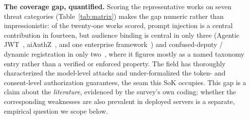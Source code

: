 \noindent\textbf{The coverage gap, quantified.} Scoring the representative works on
seven threat categories (Table~\ref{tab:matrix}) makes the gap numeric rather than
impressionistic: of the twenty-one works scored, prompt injection is a central
contribution in fourteen, but audience binding is central in only three (Agentic
JWT~\cite{agentauth2025agenticjwt}, aiAuthZ~\cite{agentauth2026aiauthz}, and one
enterprise framework~\cite{agentauth2025enterprisemcp}) and confused-deputy / dynamic
registration in only two~\cite{agentauth2026mcp38,agentauth2025enterprisemcp}, where it
figures mostly as a named taxonomy entry rather than a verified or enforced property.
The field has thoroughly characterized the model-level attacks and under-formalized the
token- and consent-level authorization guarantees, the seam this SoK occupies. This
gap is a claim about the \emph{literature}, evidenced by the survey's own coding;
whether the corresponding weaknesses are also prevalent in deployed servers is a
separate, empirical question we scope below.

